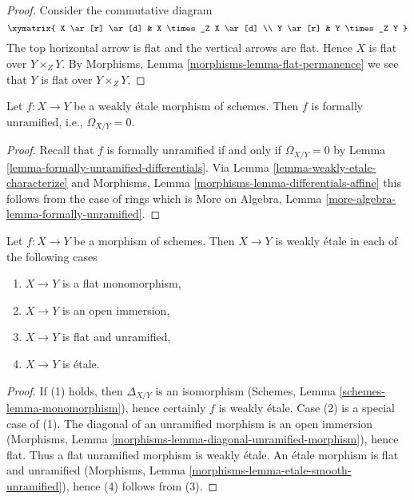 \begin{proof}
Consider the commutative diagram
$$
\xymatrix{
X \ar[r] \ar[d] & X \times_Z X \ar[d] \\
Y \ar[r] & Y \times_Z Y
}
$$
The top horizontal arrow is flat and the vertical arrows are flat.
Hence $X$ is flat over $Y \times_Z Y$. By
Morphisms, Lemma \ref{morphisms-lemma-flat-permanence}
we see that $Y$ is flat over $Y \times_Z Y$.
\end{proof}

\begin{lemma}
\label{lemma-weakly-etale-formally-unramified}
Let $f : X \to Y$ be a weakly \'etale morphism of schemes.
Then $f$ is formally unramified, i.e., $\Omega_{X/Y} = 0$.
\end{lemma}

\begin{proof}
Recall that $f$ is formally unramified if and only if $\Omega_{X/Y} = 0$ by
Lemma \ref{lemma-formally-unramified-differentials}.
Via Lemma \ref{lemma-weakly-etale-characterize} and
Morphisms, Lemma \ref{morphisms-lemma-differentials-affine}
this follows from the case of rings which is
More on Algebra, Lemma \ref{more-algebra-lemma-formally-unramified}.
\end{proof}

\begin{lemma}
\label{lemma-when-weakly-etale}
Let $f : X \to Y$ be a morphism of schemes. Then $X \to Y$ is weakly \'etale
in each of the following cases
\begin{enumerate}
\item $X \to Y$ is a flat monomorphism,
\item $X \to Y$ is an open immersion,
\item $X \to Y$ is flat and unramified,
\item $X \to Y$ is \'etale.
\end{enumerate}
\end{lemma}

\begin{proof}
If (1) holds, then $\Delta_{X/Y}$ is an isomorphism
(Schemes, Lemma \ref{schemes-lemma-monomorphism}), hence certainly
$f$ is weakly \'etale. Case (2) is a special case of (1).
The diagonal of an unramified morphism is an open immersion
(Morphisms, Lemma \ref{morphisms-lemma-diagonal-unramified-morphism}),
hence flat. Thus a flat unramified morphism is weakly \'etale.
An \'etale morphism is flat and unramified
(Morphisms, Lemma \ref{morphisms-lemma-etale-smooth-unramified}),
hence (4) follows from (3).
\end{proof}

